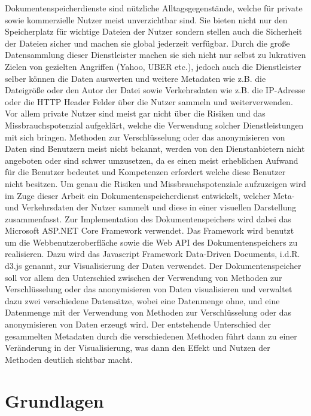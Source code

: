 \documentclass[
    fontsize=12pt,
    headings=small,
    parskip=half,           %
    bibliography=totoc,
    numbers=noenddot,       %
    open=any,               %
    ]{scrreprt}
\begin{document}
Dokumentenspeicherdienste sind nützliche Alltagsgegenstände, welche für private sowie kommerzielle Nutzer meist unverzichtbar sind. 
Sie bieten nicht nur den Speicherplatz für wichtige Dateien der Nutzer sondern stellen auch die Sicherheit der Dateien sicher und machen sie global jederzeit verfügbar. 
Durch die große Datensammlung dieser Dienstleister machen sie sich nicht nur selbst zu lukrativen Zielen von gezielten Angriffen (Yahoo, UBER etc.), jedoch auch die Dienstleister selber können die Daten auswerten und weitere Metadaten wie z.B. die Dateigröße oder den Autor der Datei sowie Verkehrsdaten wie z.B. die IP-Adresse oder die HTTP Header Felder über die Nutzer sammeln und weiterverwenden. 
Vor allem private Nutzer sind meist gar nicht über die Risiken und das Missbrauchspotenzial aufgeklärt, welche die Verwendung solcher Dienstleistungen mit sich bringen. 
Methoden zur Verschlüsselung oder das anonymisieren von Daten sind Benutzern meist nicht bekannt, werden von den Dienstanbietern nicht angeboten oder sind schwer umzusetzen, da es einen meist erheblichen Aufwand für die Benutzer bedeutet und Kompetenzen erfordert welche diese Benutzer nicht besitzen. 
Um genau die Risiken und Missbrauchspotenziale aufzuzeigen wird im Zuge dieser Arbeit ein Dokumentenspeicherdienst entwickelt, welcher Meta- und Verkehrsdaten der Nutzer sammelt und diese in einer visuellen Darstellung zusammenfasst. 
Zur Implementation des Dokumentenspeichers wird dabei das Microsoft ASP.NET Core Framework verwendet. 
Das Framework wird benutzt um die Webbenutzeroberfläche sowie die Web API des Dokumentenspeichers zu realisieren. 
Dazu wird das Javascript Framework Data-Driven Documents, i.d.R. d3.js genannt, zur Visualisierung der Daten verwendet. 
Der Dokumentenspeicher soll vor allem den Unterschied zwischen der Verwendung von Methoden zur Verschlüsselung oder das anonymisieren von Daten visualisieren und verwaltet dazu zwei verschiedene Datensätze, wobei eine Datenmenge ohne, und eine Datenmenge mit der Verwendung von Methoden zur Verschlüsselung oder das anonymisieren von Daten erzeugt wird. Der entstehende Unterschied der gesammelten Metadaten durch die verschiedenen Methoden führt dann zu einer Veränderung in der Visualisierung, was dann den Effekt und Nutzen der Methoden deutlich sichtbar macht.  

\chapter{Grundlagen}
\end{document}
